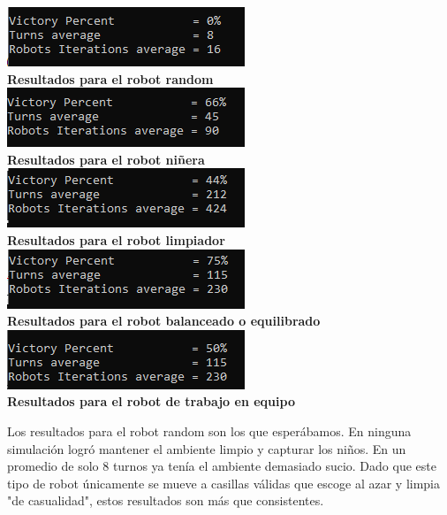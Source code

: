 \documentclass[twoside]{article}
\begin{document}
\begin{center}
\includegraphics{img/pic_1.png}\\
\textbf{Resultados para el robot random}\\[0.5cm]

\includegraphics{img/pic_2.png}\\
\textbf{Resultados para el robot ni\~nera}\\[0.5cm]

\includegraphics{img/pic_3.png}\\
\textbf{Resultados para el robot limpiador}\\[0.5cm]

\includegraphics{img/pic_4.png}\\
\textbf{Resultados para el robot balanceado o equilibrado}\\[0.5cm]

\includegraphics{img/pic_5.png}\\
\textbf{Resultados para el robot de trabajo en equipo}\\[0.5cm]
\end{center}


Los resultados para el robot random son los que esper\'abamos. En ninguna simulaci\'on logr\'o mantener el ambiente limpio y capturar los ni\~nos. En un promedio de solo 8 turnos ya ten\'ia el ambiente demasiado sucio. Dado que este tipo de robot \'unicamente se mueve a casillas v\'alidas que escoge al azar y limpia "de casualidad", estos resultados son m\'as que consistentes.
\end{document}
